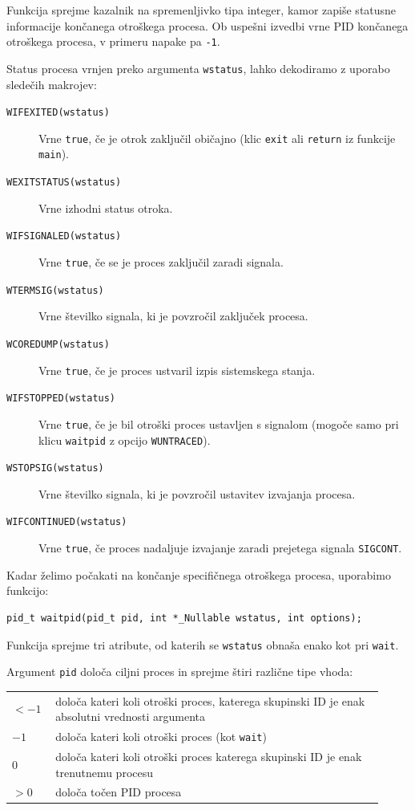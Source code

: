 \documentclass[a4paper,12pt,openright]{book}
\begin{document}
Funkcija sprejme kazalnik na spremenljivko tipa integer, kamor zapiše statusne informacije končanega otroškega procesa.
Ob uspešni izvedbi vrne PID končanega otroškega procesa, v primeru napake pa \texttt{-1}.

Status procesa vrnjen preko argumenta \texttt{wstatus}, lahko dekodiramo z uporabo sledečih makrojev:
\begin{description}
	\item [\texttt{WIFEXITED(wstatus)}] Vrne \texttt{true}, če je otrok zaključil običajno (klic \texttt{exit} ali \texttt{return} iz funkcije \texttt{main}).
	\item [\texttt{WEXITSTATUS(wstatus)}] Vrne izhodni status otroka.
	\item [\texttt{WIFSIGNALED(wstatus)}] Vrne \texttt{true}, če se je proces zaključil zaradi signala.
	\item [\texttt{WTERMSIG(wstatus)}] Vrne številko signala, ki je povzročil zaključek procesa.
	\item [\texttt{WCOREDUMP(wstatus)}] Vrne \texttt{true}, če je proces ustvaril izpis sistemskega stanja.
	\item [\texttt{WIFSTOPPED(wstatus)}] Vrne \texttt{true}, če je bil otroški proces ustavljen s signalom (mogoče samo pri klicu \texttt{waitpid} z opcijo \texttt{WUNTRACED}).
	\item [\texttt{WSTOPSIG(wstatus)}] Vrne številko signala, ki je povzročil ustavitev izvajanja procesa.
	\item [\texttt{WIFCONTINUED(wstatus)}] Vrne \texttt{true}, če proces nadaljuje izvajanje zaradi prejetega signala \texttt{SIGCONT}.
\end{description}

Kadar želimo počakati na končanje specifičnega otroškega procesa, uporabimo funkcijo:
\begin{lstlisting}[style=func]
	pid_t waitpid(pid_t pid, int *_Nullable wstatus, int options);
\end{lstlisting}

Funkcija sprejme tri atribute, od katerih se \texttt{wstatus} obnaša enako kot pri \texttt{wait}.

Argument \texttt{pid} določa ciljni proces in sprejme štiri različne tipe vhoda:

\begin{tabular}{ p{0.1\linewidth} p{0.82\linewidth} }
	$< -1$ & določa kateri koli otroški proces, katerega skupinski ID je enak absolutni vrednosti argumenta \\
	$-1$   & določa kateri koli otroški proces (kot \texttt{wait})                                          \\
	$0$    & določa kateri koli otroški proces katerega skupinski ID je enak trenutnemu procesu             \\    
	$> 0$  & določa točen PID procesa                                                                       
\end{tabular}
\end{document}
